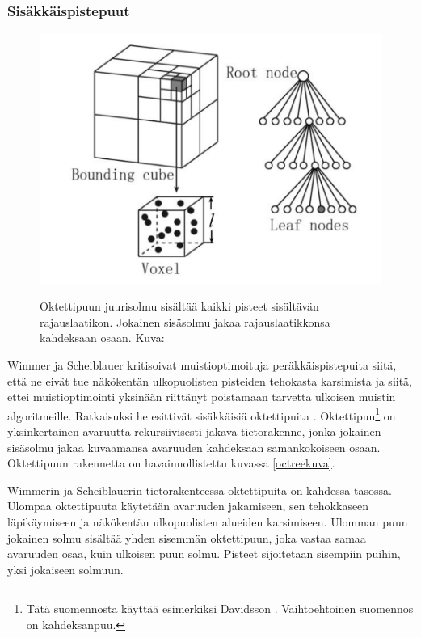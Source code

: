 \subsubsection{Sisäkkäispistepuut}
\begin{figure}
    \centering
    \includegraphics[width=0.5\paperwidth]{img/octree.png}
    \label{octree}
    \caption{Oktettipuun juurisolmu sisältää kaikki pisteet sisältävän rajauslaatikon. Jokainen sisäsolmu jakaa rajauslaatikkonsa kahdeksaan osaan. Kuva: \cite{octreekuva}}
\end{figure}

Wimmer ja Scheiblauer kritisoivat muistioptimoituja peräkkäispistepuita siitä, että ne eivät tue näkökentän ulkopuolisten pisteiden tehokasta karsimista ja siitä, ettei muistioptimointi yksinään riittänyt poistamaan tarvetta ulkoisen muistin algoritmeille. Ratkaisuksi he esittivät sisäkkäisiä oktettipuita . Oktettipuu\footnote{Tätä suomennosta käyttää esimerkiksi Davidsson \cite{oktettipuu}. Vaihtoehtoinen suomennos on kahdeksanpuu.} on yksinkertainen avaruutta rekursiivisesti jakava tietorakenne, jonka jokainen sisäsolmu jakaa kuvaamansa avaruuden kahdeksaan samankokoiseen osaan. Oktettipuun rakennetta on havainnollistettu kuvassa \ref{octreekuva}. 

Wimmerin ja Scheiblauerin tietorakenteessa oktettipuita on kahdessa tasossa. Ulompaa oktettipuuta käytetään avaruuden jakamiseen, sen tehokkaseen läpikäymiseen ja näkökentän ulkopuolisten alueiden karsimiseen. Ulomman puun jokainen solmu sisältää yhden sisemmän oktettipuun, joka vastaa samaa avaruuden osaa, kuin ulkoisen puun solmu. Pisteet sijoitetaan sisempiin puihin, yksi jokaiseen solmuun. \cite{ip}

